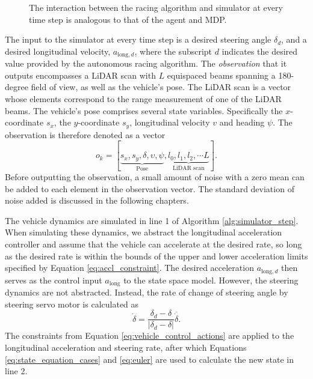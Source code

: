 \begin{figure}[htb!]
    \centering
    
    \caption[The interaction between the ]{The interaction between the racing algorithm and simulator at every time step is analogous to that of the agent and MDP.}
    \label{fig:sim_mdp}
\end{figure}



The input to the simulator at every time step is a desired steering angle $\delta_d$, and a desired longitudinal velocity, $a_{\text{long},d}$, where the subscript $d$ indicates the desired value provided by the autonomous racing algorithm.
The \emph{observation} that it outputs encompasses a LiDAR scan with $L$ equispaced beams spanning a 180-degree field of view, as well as the vehicle's pose.
The LiDAR scan is a vector whose elements correspond to the range measurement of one of the LiDAR beams.
The vehicle's pose comprises several state variables.
Specifically the $x$-coordinate $s_x$, the $y$-coordinate $s_y$, longitudinal velocity $v$ and heading $\psi$.
The observation is therefore denoted as a vector
\begin{equation}
    o_k = [\underbrace{s_{x}, s_{y}, {\delta}, {\upsilon}, \psi}_{\text{Pose}}, \underbrace{l_0, l_1, l_2, \cdots L}_{\text{LiDAR scan}}].
\end{equation}
Before outputting the observation, a small amount of noise with a zero mean can be added to each element in the observation vector.
The standard deviation of noise added is discussed in the following chapters.




The vehicle dynamics are simulated in line 1 of Algorithm \ref{alg:simulator_step}.
When simulating these dynamics, we abstract the longitudinal acceleration controller and assume that the vehicle can accelerate at the desired rate, 
so long as the desired rate is within the bounds of the upper and lower acceleration limits specified by Equation \ref{eq:accl_constraint}.
The desired acceleration $a_{\text{long},d}$ then serves as the control input $a_{\text{long}}$ to the state space model. 
However, the steering dynamics are not abstracted.
Instead, the rate of change of steering angle by steering servo motor is calculated as
\begin{equation}
    \dot{\delta} = \frac{\delta_d - \delta}{|\delta_d - \delta|} \overline{\dot{\delta}}.
\label{eq:sim_servo}
\end{equation}
The constraints from Equation \ref{eq:vehicle_control_actions} are applied to the longitudinal acceleration and steering rate, 
after which Equations \ref{eq:state_equation_cases} and \ref{eq:euler} are used to calculate the new state in line 2. 

